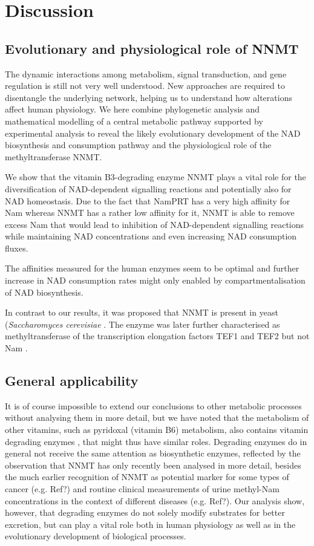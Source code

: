 
\section{Discussion}

\subsection{Evolutionary and physiological role of NNMT}

The dynamic interactions among metabolism, signal transduction, and gene regulation is still not very well understood. New approaches are required to disentangle the underlying network, helping us to understand how alterations affect human physiology. We here combine phylogenetic analysis and mathematical modelling of a central metabolic pathway supported by experimental analysis to reveal the likely evolutionary development of the NAD biosynthesis and consumption pathway and the physiological role of the methyltransferase NNMT.

We show that the vitamin B3-degrading enzyme NNMT plays a vital role for the diversification of NAD-dependent signalling reactions and potentially also for NAD homeostasis. Due to the fact that NamPRT has a very high affinity for Nam whereas NNMT has a rather low affinity for it, NNMT is able to remove excess Nam that would lead to inhibition of NAD-dependent signalling reactions while maintaining NAD concentrations and even increasing NAD consumption fluxes.

The affinities measured for the human enzymes seem to be optimal and further increase in NAD consumption rates might only enabled by compartmentalisation of NAD biosynthesis.

In contrast to our results, it was proposed that NNMT is present in yeast (\textit{Saccharomyces cerevisiae} \cite{Anderson2003}. The enzyme was later further characterised as methyltransferase of the transcription elongation factors TEF1 and TEF2 but not Nam \cite{Wlodarski2011}.


\subsection{General applicability}

It is of course impossible to extend our conclusions to other metabolic processes without analysing them in more detail, but we have noted that the metabolism of other vitamins, such as pyridoxal (vitamin B6) metabolism, also contains vitamin degrading enzymes , that might thus have similar roles. Degrading enzymes do in general not receive the same attention as biosynthetic enzymes, reflected by the observation that NNMT has only recently been analysed in more detail, besides the much earlier recognition of NNMT as potential marker for some types of cancer (e.g. Ref?) and routine clinical measurements of urine methyl-Nam concentrations in the context of different diseases (e.g. Ref?). Our analysis show, however, that degrading enzymes do not solely modify substrates for better excretion, but can play a vital role both in human physiology as well as in the evolutionary development of biological processes.



